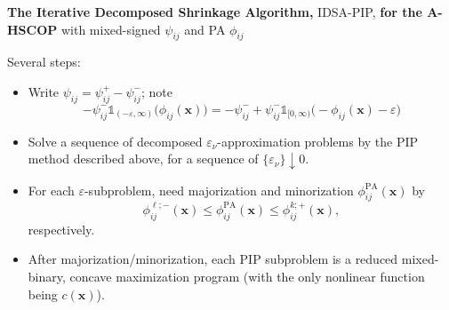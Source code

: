 \documentclass[aspectratio=169,xcolor=dvipsnames]{beamer}
\begin{document}
\begin{frame}
  \footnotesize
  \setlength{\abovedisplayskip}{3pt}
  \setlength{\belowdisplayskip}{3pt}

  \textbf{The Iterative Decomposed Shrinkage Algorithm,}
  \textcolor{MediumRed}{IDSA-PIP}, \textbf{for the A-HSCOP}
  \textcolor{MediumRed}{with mixed-signed $\psi_{ij}$ and PA $\phi_{ij}$}

  \vspace{0.04cm}
  Several steps:
  \begin{itemize}
    \setlength{\itemsep}{0.10cm}
    \item Write $\psi_{ij}=\psi^+_{ij}-\psi^-_{ij}$; note
      \[
        -\psi^-_{ij}\mathds{1}_{(-\varepsilon,\infty)}
          \bigl(\phi_{ij}(\mathbf{x})\bigr)
        =-\psi^-_{ij}+\psi^-_{ij}\mathds{1}_{[0,\infty)}
          \bigl(-\phi_{ij}(\mathbf{x})-\varepsilon\bigr)
      \]
    \item Solve a sequence of decomposed $\varepsilon_\nu$-approximation
      problems by the PIP method described above, for a sequence of
      $\{\varepsilon_\nu\}\downarrow 0$.
    \item For each $\varepsilon$-subproblem, need majorization and
      minorization $\phi^{\mathrm{PA}}_{ij}(\mathbf{x})$ by
      \[
        \phi^{\ell;-}_{ij}(\mathbf{x})\leq\phi^{\mathrm{PA}}_{ij}(\mathbf{x})
        \leq\phi^{k;+}_{ij}(\mathbf{x}),
      \]
      respectively.
    \item After majorization/minorization, each PIP subproblem is a reduced
      mixed-binary, concave maximization program (with the only nonlinear
      function being $c(\mathbf{x})$).
  \end{itemize}
\end{frame}
\end{document}
